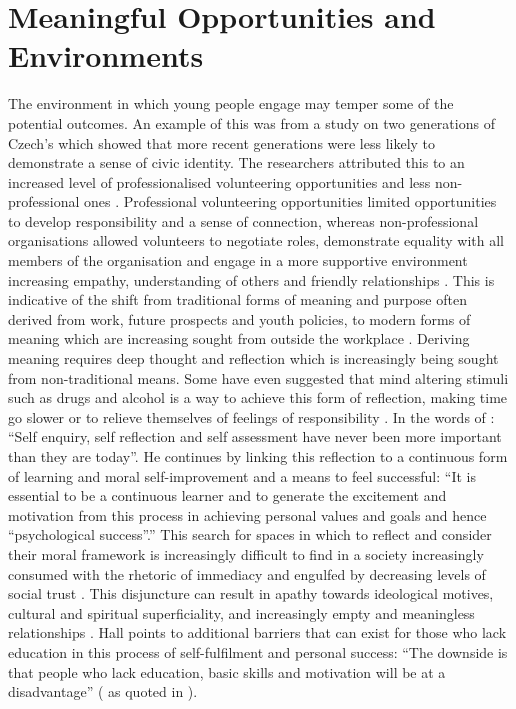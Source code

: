 \section{Meaningful Opportunities and Environments}
The environment in which young people engage may temper some of the potential outcomes. An example of this was from a study on two generations of Czech's which showed that more recent generations were less likely to demonstrate a sense of civic identity. The researchers attributed this to an increased level of professionalised volunteering opportunities and less non-professional ones \citep{Serek2016}. Professional volunteering opportunities limited opportunities to develop responsibility and a sense of connection, whereas non-professional organisations allowed volunteers to negotiate roles, demonstrate equality with all members of the organisation and engage in a more supportive environment increasing empathy, understanding of others and friendly relationships \citep{Serek2016}. This is indicative of the shift from traditional forms of meaning and purpose often derived from work, future prospects and youth policies, to modern forms of meaning which are increasing sought from outside the workplace \citep{Abbott-Chapman2000}. Deriving meaning requires deep thought and reflection which is increasingly being sought from non-traditional means. Some have even suggested that mind altering stimuli such as drugs and alcohol is a way to achieve this form of reflection, making time go slower or to relieve themselves of feelings of responsibility \citep{Abbott-Chapman2000}. In the words of \citet{Hall1996}: “Self enquiry, self reflection and self assessment have never been more important than they are today”. He continues by linking this reflection to a continuous form of learning and moral self-improvement and a means to feel successful: “It is essential to be a continuous learner and to generate the excitement and motivation from this process in achieving personal values and goals and hence “psychological success”.” This search for spaces in which to reflect and consider their moral framework is increasingly difficult to find in a society increasingly consumed with the rhetoric of immediacy and engulfed by decreasing levels of social trust \citep{Eisenstadt1995,Abbott-Chapman2000}. This disjuncture can result in apathy towards ideological motives, cultural and spiritual superficiality, and increasingly empty and meaningless relationships \citep{Eisenstadt1995,Abbott-Chapman2000}. Hall points to additional barriers that can exist for those who lack education in this process of self-fulfilment and personal success: “The downside is that people who lack education, basic skills and motivation will be at a disadvantage” (\citealp[][p14]{Hall1996} as quoted in \citealp[][p23]{Abbott-Chapman2000}). 





